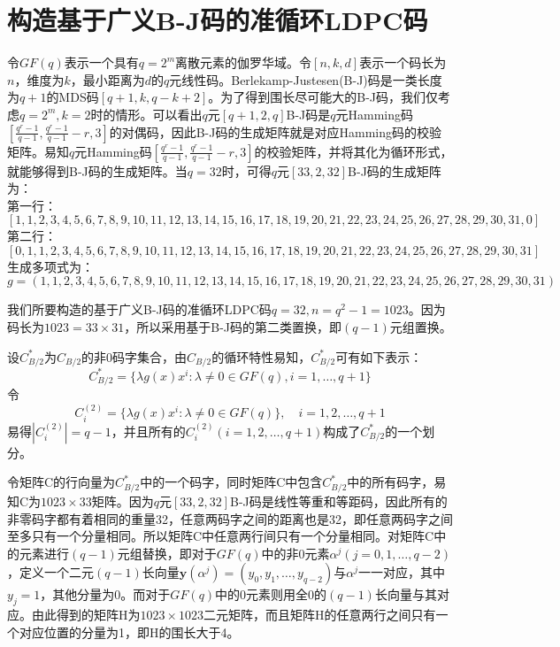 \documentclass[lang=cn,11pt,a4paper,numbers]{elegantpaper}
\begin{document}
\section{构造基于广义B-J码的准循环LDPC码}
令$GF(q)$表示一个具有$q=2^m$离散元素的伽罗华域。令$[n,k,d]$表示一个码长为$n$，维度为$k$，最小距离为$d$的$q$元线性码。Berlekamp-Justesen(B-J)码是一类长度为$q+1$的MDS码$[q+1,k,q-k+2]$。为了得到围长尽可能大的B-J码，我们仅考虑$q=2^m,k=2$时的情形。可以看出$q$元$[q+1,2,q]$B-J码是$q$元Hamming码$[\frac{q^r-1}{q-1},\frac{q^r-1}{q-1}-r,3]$的对偶码，因此B-J码的生成矩阵就是对应Hamming码的校验矩阵。易知$q$元Hamming码$[\frac{q^r-1}{q-1},\frac{q^r-1}{q-1}-r,3]$的校验矩阵，并将其化为循环形式，就能够得到B-J码的生成矩阵。当$q=32$时，可得$q$元$[33,2,32]$B-J码的生成矩阵为：
\\第一行：$$[1,1,2,3,4,5,6,7,8,9,10,11,12,13,14,15,16,17,18,19,20,21,22,23,24,25,26,27,28,29,30,31,0]$$
第二行：$$[0,1,1,2,3,4,5,6,7,8,9,10,11,12,13,14,15,16,17,18,19,20,21,22,23,24,25,26,27,28,29,30,31]$$
生成多项式为：$$g=(1,1,2,3,4,5,6,7,8,9,10,11,12,13,14,15,16,17,18,19,20,21,22,23,24,25,26,27,28,29,30,31)$$

我们所要构造的基于广义B-J码的准循环LDPC码$q=32,n=q^2-1=1023$。因为码长为$1023=33 \times 31$，所以采用基于B-J码的第二类置换，即$(q-1)$元组置换。

设$C_{B/2}^{*}$为$C_{B/2}$的非0码字集合，由$C_{B/2}$的循环特性易知，$C_{B/2}^{*}$可有如下表示：
\begin{equation}
C_{B/2}^{*} = \{\lambda g(x)x^i: \lambda \neq 0 \in GF(q), i=1,\dots, q+1\}
\end{equation}
令
\begin{equation}
C_i^{(2)} = \{\lambda g(x)x^i: \lambda \neq 0 \in GF(q)\}, \quad i=1,2,\dots, q+1
\end{equation}
易得$|C_i^{(2)}|=q-1$，并且所有的$C_i^{(2)}(i=1,2,\dots,q+1)$构成了$C_{B/2}^{*}$的一个划分。

令矩阵C的行向量为$C_{B/2}^{*}$中的一个码字，同时矩阵C中包含$C_{B/2}^{*}$中的所有码字，易知C为$1023\times 33$矩阵。因为$q$元$[33,2,32]$B-J码是线性等重和等距码，因此所有的非零码字都有着相同的重量32，任意两码字之间的距离也是32，即任意两码字之间至多只有一个分量相同。所以矩阵C中任意两行间只有一个分量相同。对矩阵C中的元素进行$(q-1)$元组替换，即对于$GF(q)$中的非0元素$\alpha^j(j=0,1,\dots,q-2)$，定义一个二元$(q-1)$长向量$\mathbf{y}(\alpha^j)=(y_0,y_1,\dots,y_{q-2})$与$\alpha^j$一一对应，其中$y_j=1$，其他分量为0。而对于$GF(q)$中的0元素则用全0的$(q-1)$长向量与其对应。由此得到的矩阵H为$1023 \times 1023$二元矩阵，而且矩阵H的任意两行之间只有一个对应位置的分量为1，即H的围长大于4。
\end{document}
